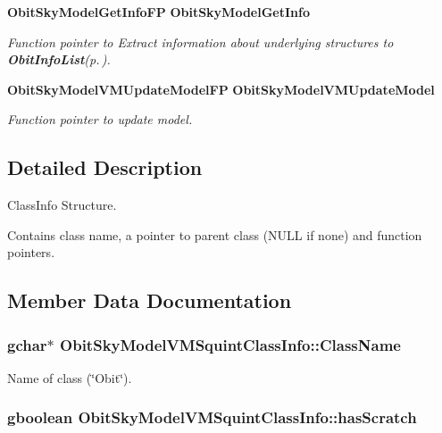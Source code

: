 \begin{CompactItemize}
{\bf Obit\-Sky\-Model\-Get\-Info\-FP} {\bf Obit\-Sky\-Model\-Get\-Info}
\begin{CompactList}\small\item\em Function pointer to Extract information about underlying structures to {\bf Obit\-Info\-List}{\rm (p.\,\pageref{structObitInfoList})}. \item\end{CompactList}\item 
{\bf Obit\-Sky\-Model\-VMUpdate\-Model\-FP} {\bf Obit\-Sky\-Model\-VMUpdate\-Model}
\begin{CompactList}\small\item\em Function pointer to update model. \item\end{CompactList}\end{CompactItemize}


\subsection{Detailed Description}
Class\-Info Structure. 

Contains class name, a pointer to parent class (NULL if none) and function pointers. 



\subsection{Member Data Documentation}
\subsubsection{\setlength{\rightskip}{0pt plus 5cm}gchar$\ast$ {\bf Obit\-Sky\-Model\-VMSquint\-Class\-Info::Class\-Name}}\label{structObitSkyModelVMSquintClassInfo_o2}


Name of class (\char`\"{}Obit\char`\"{}). 

\subsubsection{\setlength{\rightskip}{0pt plus 5cm}gboolean {\bf Obit\-Sky\-Model\-VMSquint\-Class\-Info::has\-Scratch}}\label{structObitSkyModelVMSquintClassInfo_o1}


